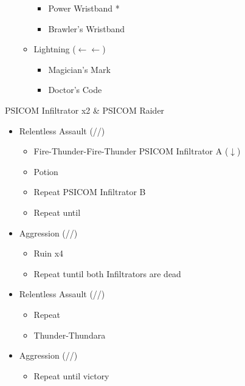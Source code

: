 \begin{menu}
\begin{multicols}{2}
\begin{itemize}
\begin{itemize}
				      \begin{itemize}
					      \item Power Wristband *
					      \item Brawler's Wristband
				      \end{itemize}
				\item Lightning ($\leftarrow\leftarrow$)
				      \begin{itemize}
					      \item Magician's Mark
					      \item Doctor's Code
				      \end{itemize}
			\end{itemize}
		\end{itemize}
	\end{multicols}
\end{menu}
\renewcommand{\fourth}{[4] Relentless Assault (\rav/\rav/\com)}
\renewcommand{\fifth}{[5] Aggression (\com/\rav/\com)}
\begin{battle}[0:42]{PSICOM Infiltrator x2 \& PSICOM Raider}
	\begin{itemize}
		\item \fourth
		      \begin{itemize}
			      \item Fire-Thunder-Fire-Thunder PSICOM Infiltrator A ($\downarrow$)
			      \item Potion
			      \item Repeat PSICOM Infiltrator B
			      \item Repeat until \stagger
		      \end{itemize}
		\item \fifth
		      \begin{itemize}
			      \item Ruin x4
			      \item Repeat tuntil both Infiltrators are dead
		      \end{itemize}
		\item \fourth
		      \begin{itemize}
			      \item Repeat
			      \item Thunder-Thundara
			            \stagger
		      \end{itemize}
		\item \fifth
		      \begin{itemize}
			      \item Repeat until victory
		      \end{itemize}
	\end{itemize}
	 
\end{battle}

